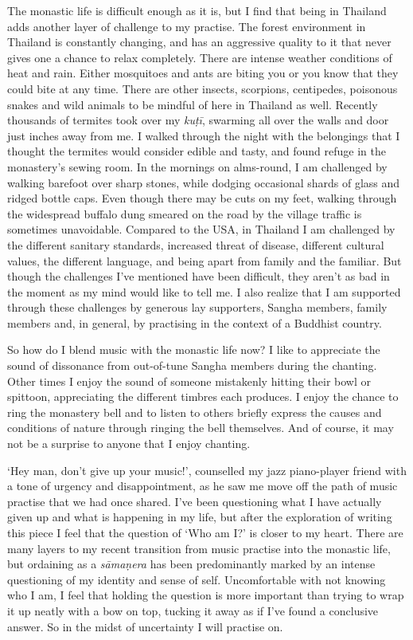 The monastic life is difficult enough as it is, but I find that being in
Thailand adds another layer of challenge to my practise. The forest
environment in Thailand is constantly changing, and has an aggressive
quality to it that never gives one a chance to relax completely. There
are intense weather conditions of heat and rain. Either mosquitoes and
ants are biting you or you know that they could bite at any time. There
are other insects, scorpions, centipedes, poisonous snakes and wild
animals to be mindful of here in Thailand as well. Recently thousands of
termites took over my \emph{kuṭī}, swarming all over the walls and door
just inches away from me. I walked through the night with the belongings
that I thought the termites would consider edible and tasty, and found
refuge in the monastery's sewing room. In the mornings on alms-round, I
am challenged by walking barefoot over sharp stones, while dodging
occasional shards of glass and ridged bottle caps. Even though there may
be cuts on my feet, walking through the widespread buffalo dung smeared
on the road by the village traffic is sometimes unavoidable. Compared to
the USA, in Thailand I am challenged by the different sanitary
standards, increased threat of disease, different cultural values, the
different language, and being apart from family and the familiar. But
though the challenges I've mentioned have been difficult, they aren't as
bad in the moment as my mind would like to tell me. I also realize that
I am supported through these challenges by generous lay supporters, 
Sangha members, family members and, in general, by practising in the
context of a Buddhist country. 

So how do I blend music with the monastic life now? I like to appreciate
the sound of dissonance from out-of-tune Sangha members during the
chanting. Other times I enjoy the sound of someone mistakenly hitting
their bowl or spittoon, appreciating the different timbres each
produces. I enjoy the chance to ring the monastery bell and to listen to
others briefly express the causes and conditions of nature through
ringing the bell themselves. And of course, it may not be a surprise to
anyone that I enjoy chanting. 

`Hey man, don't give up your music!', counselled my jazz piano-player
friend with a tone of urgency and disappointment, as he saw me move off
the path of music practise that we had once shared. I've been
questioning what I have actually given up and what is happening in my
life, but after the exploration of writing this piece I feel that the
question of `Who am I?' is closer to my heart. There are many layers to
my recent transition from music practise into the monastic life, but
ordaining as a \emph{sāmaṇera} has been predominantly marked by an
intense questioning of my identity and sense of self. Uncomfortable with
not knowing who I am, I feel that holding the question is more important
than trying to wrap it up neatly with a bow on top, tucking it away as
if I've found a conclusive answer. So in the midst of uncertainty I will
practise on. 

